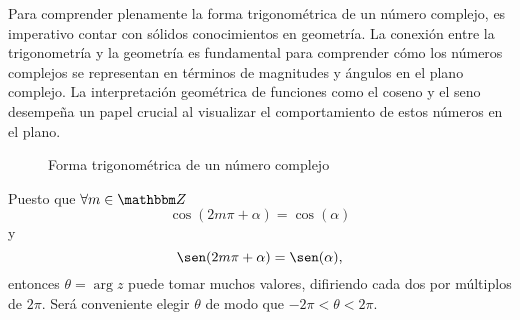Para comprender plenamente la forma trigonométrica de un número complejo, es imperativo contar con sólidos conocimientos en geometría. La conexión entre la trigonometría y la geometría es fundamental para comprender cómo los números complejos se representan en términos de magnitudes y ángulos en el plano complejo. La interpretación geométrica de funciones como el coseno y el seno desempeña un papel crucial al visualizar el comportamiento de estos números en el plano.
\begin{figure}[h!]
    \centering
    \caption{Forma trigonométrica de un número complejo}
\end{figure}

Puesto que $\forall m \in \ZZ$
$$\cos (2m\pi + \alpha ) = \cos (\alpha)$$
y
$$\sen (2m\pi + \alpha) = \sen (\alpha),$$
entonces $\theta = \arg z$ puede tomar muchos valores, difiriendo cada dos por múltiplos de $2\pi$. Será conveniente elegir $\theta$ de modo que $-2\pi < \theta < 2\pi$.

